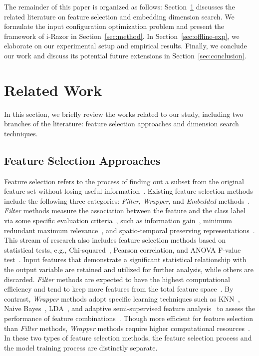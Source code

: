 \documentclass[10pt,journal,compsoc]{IEEEtran}
\begin{document}
The remainder of this paper is organized as follows: Section~\ref{sec:related} discusses the related literature on feature selection and embedding dimension search. We formulate the input configuration optimization problem and present the framework of i-Razor in Section~\ref{sec:method}. In Section~\ref{sec:offline-exp}, we elaborate on our experimental setup and empirical results. Finally, we conclude our work and discuss its potential future extensions in Section~\ref{sec:conclusion}.


\section{Related Work}\label{sec:related}
In this section, we briefly review the works related to our study, including two branches of the literature: feature selection approaches and dimension search techniques.
\subsection{Feature Selection Approaches}
Feature selection refers to the process of finding out a subset from the original feature set without losing useful information~\cite{cai2018feature}. 
Existing feature selection methods include the following three categories: \textit{Filter}, \textit{Wrapper}, and \textit{Embedded} methods~\cite{mafarja2020dragonfly}. \textit{Filter} methods measure the association between the feature and the class label via some specific evaluation criteria~\cite{cai2018feature}, such as information gain~\cite{lee2006information}, minimum redundant maximum relevance~\cite{peng2005feature},  {and spatio-temporal preserving representations~\cite{zhang2019making}}. This stream of research also includes feature selection methods based on statistical tests, e.g., Chi-squared~\cite{1996A}, Pearson correlation, and ANOVA F-value test~\cite{1965An}. 
Input features that {demonstrate a significant} 
statistical relationship with the output variable  {are}  retained and utilized for further analysis,  {while others are discarded.} 
\textit{Filter} methods are expected to have the highest computational efficiency and tend to keep more features from the total feature space{~\cite{wang2020bacterial,zheng2023automl}.}
 {By contrast, \textit{Wrapper} methods adopt specific learning techniques such as} 
 KNN~\cite{dudani1976distance}, Naive Bayes~\cite{rish2001empirical}, LDA~\cite{ahdesmaki2010feature},  {and adaptive semi-supervised feature analysis~\cite{luo2017adaptive}} to assess the performance of feature combinations~\cite{xue2015survey}. 
 {Though more efficient for feature selection than \textit{Filter} methods, \textit{Wrapper} methods require higher computational resources}~\cite{pourpanah2019hybrid}.
In these two types of feature selection methods, the feature selection process and the model training process are distinctly separate. 
\end{document}
